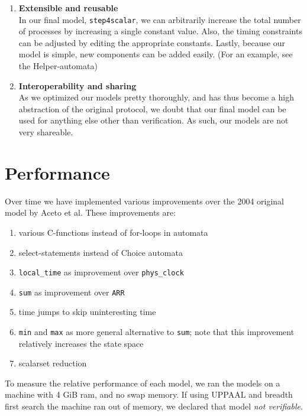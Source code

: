 \documentclass[a4paper,10pt]{article}
\newcommand{\UPPAAL}{UPPAAL\xspace}
\newcommand{\oldorig}{2004 original model\xspace}
\newcommand{\newfinal}{our final model\xspace}
\begin{document}
\begin{enumerate}
\item \textbf{Extensible and reusable} \\
	In \newfinal, \texttt{step4scalar}, we can arbitrarily increase the total number of processes by increasing a single constant value. Also, the timing constraints can be adjusted by editing the appropriate constants. Lastly, because our model is simple, new components can be added easily. (For an example, see the Helper-automata)
\item \textbf{Interoperability and sharing} \\
	As we optimized our models pretty thoroughly, and has thus become a high abstraction of the original protocol, we doubt that \newfinal can be used for anything else other than verification. As such, our models are not very shareable.
\end{enumerate}

\section{Performance\label{sec:performance}}


Over time we have implemented various improvements over the \oldorig by Aceto et al. These improvements are:

\begin{enumerate}
\item various C-functions instead of for-loops in automata
\item select-statements instead of Choice automata
\item \texttt{local\_time} as improvement over \texttt{phys\_clock}
\item \texttt{sum} as improvement over \texttt{ARR}
\item time jumps to skip uninteresting time
\item \texttt{min} and \texttt{max} as more general alternative to \texttt{sum}; note that this improvement relatively increases the state space
\item scalarset reduction
\end{enumerate}

To measure the relative performance of each model, we ran the models on a machine with 4 GiB ram, and no swap memory. If using \UPPAAL and breadth first search the machine ran out of memory, we declared that model \emph{not verifiable}.
\end{document}
